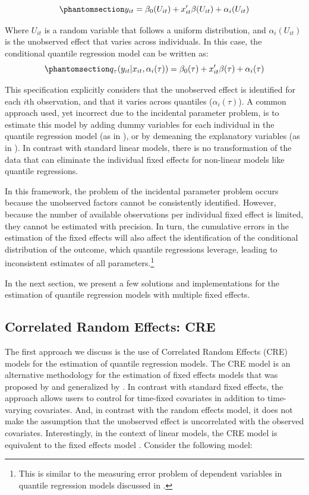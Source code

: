 \documentclass[bib]{statapress}
\begin{document}
\begin{equation}\phantomsection\label{eq-dgp-panel}{y_{it} = \beta_0(U_{it}) + x_{it}'\beta(U_{it}) + \alpha_i(U_{it})
}\end{equation}

Where \(U_{it}\) is a random variable that follows a uniform
distribution, and \(\alpha_i(U_{it})\) is the unobserved effect that
varies across individuals. In this case, the conditional quantile
regression model can be written as:
\begin{equation}\phantomsection\label{eq-feqr}{q_\tau(y_{it}|x_{it},\alpha_i(\tau))=\beta_0(\tau) + x_{it}'\beta(\tau)+\alpha_i(\tau) 
}\end{equation}

This specification explicitly considers that the unobserved effect is
identified for each \(i\)th observation, and that it varies across
quantiles (\(\alpha_i(\tau)\)). A common approach used, yet incorrect
due to the incidental parameter problem, is to estimate this model by
adding dummy variables for each individual in the quantile regression
model (as in \citet{budig2001}), or by demeaning the explanatory
variables (as in \citet{budig2010}). In contrast with standard linear
models, there is no transformation of the data that can eliminate the
individual fixed effects for non-linear models like quantile
regressions.

In this framework, the problem of the incidental parameter problem
occurs because the unobserved factors cannot be consistently identified.
However, because the number of available observations per individual
fixed effect is limited, they cannot be estimated with precision. In
turn, the cumulative errors in the estimation of the fixed effects will
also affect the identification of the conditional distribution of the
outcome, which quantile regressions leverage, leading to inconsistent
estimates of all parameters.\footnote{This is similar to the measuring
  error problem of dependent variables in quantile regression models
  discussed in \citet{hausman2021}.}

In the next section, we present a few solutions and implementations for
the estimation of quantile regression models with multiple fixed
effects.

\subsection{Correlated Random Effects: CRE}\label{sec-cre}

The first approach we discuss is the use of Correlated Random Effects
(CRE) models for the estimation of quantile regression models. The CRE
model is an alternative methodology for the estimation of fixed effects
models that was proposed by \citet{mundlak1978} and generalized by
\citet{chamberlain1982}. In contrast with standard fixed effects, the
approach allows users to control for time-fixed covariates in addition
to time-varying covariates. And, in contrast with the random effects
model, it does not make the assumption that the unobserved effect is
uncorrelated with the observed covariates. Interestingly, in the context
of linear models, the CRE model is equivalent to the fixed effects model
\citep{wooldridge2010}. Consider the following model:
\end{document}

